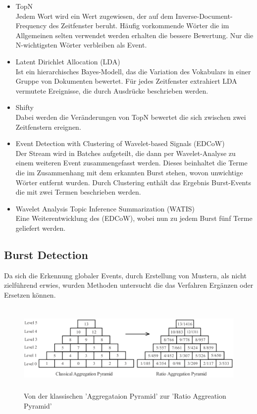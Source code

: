 \begin{itemize}
\item TopN\\Jedem Wort wird ein Wert zugewiesen, der auf dem Inverse-Document-Frequency des Zeitfenster beruht. Häufig vorkommende Wörter die im Allgemeinen selten verwendet werden erhalten die bessere Bewertung. Nur die N-wichtigsten Wörter verbleiben als Event.
\item Latent Dirichlet Allocation (LDA)\\Ist ein hierarchisches Bayes-Modell, das die Variation des Vokabulars in einer Gruppe von Dokumenten bewertet. Für jedes Zeitfenster extrahiert LDA  vermutete Ereignisse, die durch Ausdrücke beschrieben werden. 
\item Shifty\\Dabei werden die Veränderungen von TopN bewertet die sich zwischen zwei Zeitfenstern ereignen.
\item Event Detection with Clustering of
Wavelet-based Signals (EDCoW)\\Der Stream wird in Batches aufgeteilt, die dann per Wavelet-Analyse zu einem weiteren Event zusammengefasst werden. Dieses beinhaltet die Terme die im Zusammenhang mit dem erkannten Burst stehen, wovon unwichtige Wörter entfernt wurden. Durch Clustering enthält das Ergebnis Burst-Events die mit zwei Termen beschrieben werden.
\item Wavelet Analysis Topic Inference Summarization
(WATIS)\\ Eine Weiterentwicklung des (EDCoW), wobei nun zu jedem Burst fünf Terme geliefert werden.
\end{itemize}

\subsection{Burst Detection}
Da sich die Erkennung globaler Events, durch Erstellung von Mustern, als nicht zielführend erwies, wurden Methoden untersucht die das Verfahren  Ergänzen oder Ersetzen können.\\

\begin{figure}[ht]
    \centerline{\includegraphics[height=4.4cm]{images/ratiopyramid.png}}
    \caption{Von der klassischen 'Aggregataion Pyramid' zur 'Ratio Aggreation Pyramid' \cite{yuan2007online}}
    \label{fig:ratiopyramid}
\end{figure}


